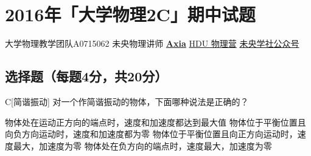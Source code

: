 \chapter{2016年「大学物理2C」期中试题}
\date{2016年11月20日}{大学物理教学团队}{A0715062}
{未央物理讲师 \href{https://qm.qq.com/q/UPbGudx8cK}{\textbf{Axia}}}
{}{\href{https://qm.qq.com/q/asJiytD5pC}{HDU 物理营}}
{}{\href{http://weixin.qq.com/r/mhKYgFTEMQlOrRDj90eI}{未央学社公众号}}
\section{选择题（每题4分，共20分）}
\begin{choice}{C}[简谐振动]
    对一个作简谐振动的物体，下面哪种说法是正确的？
\begin{tasks}
    \task 物体处在运动正方向的端点时，速度和加速度都达到最大值
    \task 物体位于平衡位置且向负方向运动时，速度和加速度都为零
    \task 物体位于平衡位置且向正方向运动时，速度最大，加速度为零
    \task 物体处在负方向的端点时，速度最大，加速度为零
\end{tasks}
\end{choice}
\begin{solution}
\end{solution}